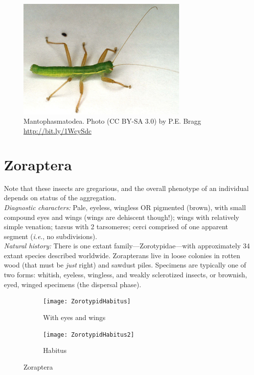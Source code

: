 \documentclass[letterpaper, 11pt]{article}
\begin{document}
\begin{figure}[ht!]
  \centering
    \includegraphics[width=0.75\textwidth]{mantophas}
  \caption{Mantophasmatodea. Photo (CC BY-SA 3.0) by P.E. Bragg \url{http://bit.ly/1WcySdc}}
  \label{fig:mantophas}
\end{figure}

\section{Zoraptera}

\noindent{}Note that these insects are gregarious, and the overall phenotype of an individual depends on status of the aggregation.\\

\noindent{}\textit{Diagnostic characters:} Pale, eyeless, wingless OR pigmented (brown), with small compound eyes and wings (wings are dehiscent though!); wings with relatively simple venation; tarsus with 2 tarsomeres; cerci comprised of one apparent segment (\textit{i.e.}, no subdivisions).\\

\noindent{}\textit{Natural history:} There is one extant family---Zorotypidae---with approximately 34 extant species described worldwide. Zorapterans live in loose colonies in rotten wood (that must be \textit{just} right) and sawdust piles. Specimens are typically one of two forms: whitish, eyeless, wingless, and weakly sclerotized insects, or brownish, eyed, winged specimens (the dispersal phase). \\

\begin{figure}[ht!]
    \centering
    \begin{subfigure}[ht!]{0.46\textwidth}
        \texttt{[image: ZorotypidHabitus]}
        \caption{With eyes and wings \citep[][Figs. 1,5]{bhlpart32187}}
        \label{fig:zorotypid1}
    \end{subfigure}
    \qquad
    \begin{subfigure}[ht!]{0.44\textwidth}
        \texttt{[image: ZorotypidHabitus2]}
        \caption{Habitus \citep[][Figs. 2--4]{bhlpart32187}}
        \label{fig:zorotypid2}
    \end{subfigure}
    \caption{Zoraptera}\label{fig:zorotypids}
\end{figure}
\end{document}
